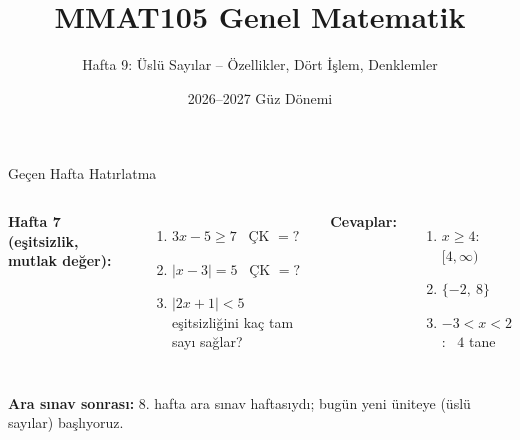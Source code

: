 \documentclass[aspectratio=169,11pt]{beamer}
\title[MMAT105 -- Hafta 9]{MMAT105 Genel Matematik}
\subtitle{Hafta 9: Üslü Sayılar -- Özellikler, Dört İşlem, Denklemler}
\author{}
\date{2026--2027 Güz Dönemi}
\begin{document}
\begin{frame}
\titlepage
\end{frame}


\begin{frame}{Geçen Hafta Hatırlatma}
\begin{columns}[t]
\textbf{Hafta 7 (eşitsizlik, mutlak değer):}
\begin{enumerate}
\item \(3x-5\ge 7\) \ ÇK \(=?\)
\item \(|x-3|=5\) \ ÇK \(=?\)
\item \(|2x+1|<5\) eşitsizliğini kaç tam sayı sağlar?
\end{enumerate}
\pause
\textbf{Cevaplar:}
\begin{enumerate}
\item \(x\ge 4\): \ \([4,\infty)\)
\item \(\{-2,\ 8\}\)
\item \(-3<x<2\): \ \(4\) tane
\end{enumerate}
\end{columns}
\vspace{8pt}
{\footnotesize \textbf{Ara sınav sonrası:} 8. hafta ara sınav haftasıydı; bugün yeni üniteye (üslü sayılar) başlıyoruz.}
\end{frame}
\end{document}
